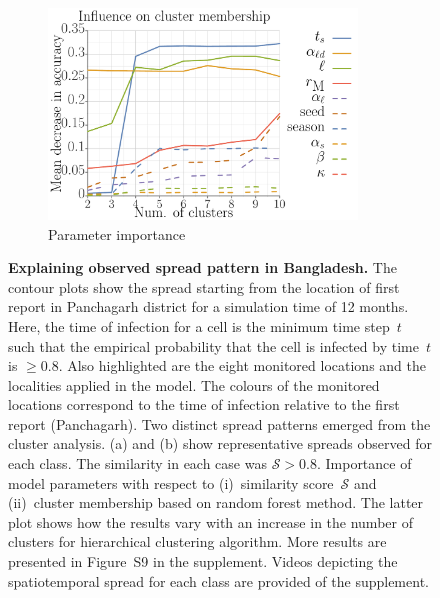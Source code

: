 \documentclass[11pt]{article}
\newcommand{\similarity}{\mathcal{S}}
\theoremstyle{definition}
\begin{document}
\begin{figure}[t]
\begin{subfigure}[b]{.32\textwidth}
    \includegraphics[width=0.9\textwidth]{rf_k_agglomerative_mse.pdf}
    \caption{Parameter importance \label{fig:rf}}
\end{subfigure}
\caption{\textbf{Explaining observed spread pattern in Bangladesh.} The
contour plots show the spread starting from the location of first report in
Panchagarh district for a simulation time of 12 months.  Here, the time of
infection for a cell is the minimum time step~$t$ such that the empirical
probability that the cell is infected by time~$t$ is $\ge0.8$. Also
highlighted are the eight monitored locations and the localities applied in
the model. The colours of the monitored locations correspond to the time of
infection relative to the first report (Panchagarh). Two distinct spread
patterns emerged from the cluster analysis. (a) and (b) show representative
spreads observed for each class. The similarity in each case was
$\similarity>0.8$.  Importance of model parameters with respect to
(i)~similarity score~$\similarity$ and (ii)~cluster membership based on
random forest method. The latter plot shows how the results vary with an
increase in the number of clusters for hierarchical clustering algorithm.
More results are presented in Figure~S9 in the supplement.
Videos depicting the spatiotemporal spread for each class are provided of
the supplement.
}
\end{figure}
\end{document}
